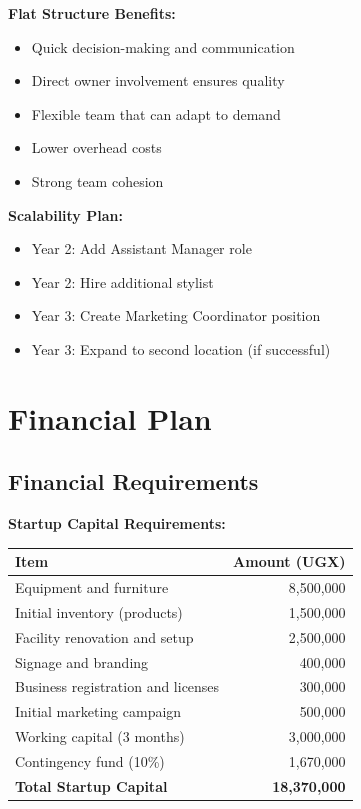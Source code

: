 \documentclass[a4paper,12pt]{article}
\begin{document}
\vspace{1em}

\begin{tcolorbox}[mybox, title=\textbf{Organizational Design Rationale}]
\textbf{Flat Structure Benefits:}
\begin{itemize}[leftmargin=1em, itemsep=0pt]
    \item Quick decision-making and communication
    \item Direct owner involvement ensures quality
    \item Flexible team that can adapt to demand
    \item Lower overhead costs
    \item Strong team cohesion
\end{itemize}

\textbf{Scalability Plan:}
\begin{itemize}[leftmargin=1em, itemsep=0pt]
    \item Year 2: Add Assistant Manager role
    \item Year 2: Hire additional stylist
    \item Year 3: Create Marketing Coordinator position
    \item Year 3: Expand to second location (if successful)
\end{itemize}
\end{tcolorbox}

\newpage
\section{Financial Plan}

\subsection{Financial Requirements}

\textbf{Startup Capital Requirements:}

\begin{tabular}{|l|r|}
\hline
\textbf{Item} & \textbf{Amount (UGX)} \\
\hline
Equipment and furniture & 8,500,000 \\
Initial inventory (products) & 1,500,000 \\
Facility renovation and setup & 2,500,000 \\
Signage and branding & 400,000 \\
Business registration and licenses & 300,000 \\
Initial marketing campaign & 500,000 \\
Working capital (3 months) & 3,000,000 \\
Contingency fund (10\%) & 1,670,000 \\
\hline
\textbf{Total Startup Capital} & \textbf{18,370,000} \\
\hline
\end{tabular}
\end{document}
